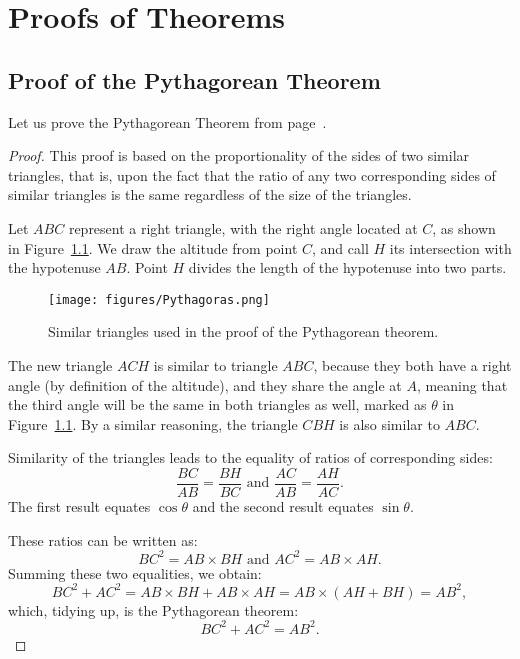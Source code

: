 % 
\chapter{Proofs of Theorems}
\label{app:proofs}

\section{Proof of the Pythagorean Theorem}

Let us prove the Pythagorean Theorem from page~\pageref{thm:pythagoras}.

\begin{proof}
This proof is based on the proportionality of the sides of two similar triangles, that is, upon the fact that the ratio of any two corresponding sides of similar triangles is the same regardless of the size of the triangles.

Let $ABC$ represent a right triangle, with the right angle located at $C$, as shown in Figure~\ref{fig:Pythagoras}. We draw the altitude from point $C$, and call $H$ its intersection with the hypotenuse $AB$. Point $H$ divides the length of the hypotenuse into two parts. 

\begin{figure}[htb]
	\centering
		\texttt{[image: figures/Pythagoras.png]}
	\caption{Similar triangles used in the proof of the Pythagorean theorem.}
	\label{fig:Pythagoras}
\end{figure}

The new triangle $ACH$ is similar to triangle $ABC$, because they both have a right angle (by definition of the altitude), and they share the angle at $A$, meaning that the third angle will be the same in both triangles as well, marked as $\theta$ in Figure~\ref{fig:Pythagoras}. By a similar reasoning, the triangle $CBH$ is also similar to $ABC$. 

Similarity of the triangles leads to the equality of ratios of corresponding sides:
\begin{equation}
    \frac{BC}{AB}=\frac{BH}{BC} \text{ and } \frac{AC}{AB}=\frac{AH}{AC}.
\end{equation}
The first result equates $\cos \theta$ and the second result equates $\sin \theta$.

These ratios can be written as:
\begin{equation}
    {BC}^{2}={AB}\times {BH} \text{ and }{AC}^{2}={AB}\times {AH}.
\end{equation}
Summing these two equalities, we obtain:
\begin{equation}
    {BC}^{2}+{AC}^{2}={AB}\times {BH}+{AB}\times {AH}={AB}\times({AH}+{BH})={AB}^{2} ,
\end{equation}
which, tidying up, is the Pythagorean theorem:
\begin{equation}
    {BC}^{2}+{AC}^{2}={AB}^{2}.
\end{equation}
\end{proof}
